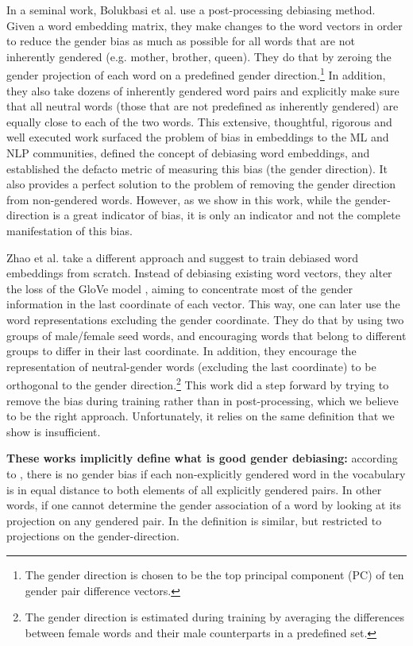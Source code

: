 \documentclass[11pt,a4paper]{article}
\begin{document}
	In a seminal work, Bolukbasi et al. \citeyearpar{BCZ16} use a post-processing debiasing method. Given a word embedding matrix, they make changes to the word vectors in order to reduce the gender bias as much as possible for all words that are not inherently gendered (e.g. mother, brother, queen). They do that by zeroing the gender projection of each word on a predefined gender direction.\footnote{The gender direction is chosen to be the top principal component (PC) of ten gender pair difference vectors.} In addition, they also take dozens of inherently gendered word pairs and explicitly make sure that all neutral words (those that are not predefined as inherently gendered) are equally close to each of the two words. This extensive, thoughtful, rigorous and well executed work surfaced the problem of bias in embeddings to the ML and NLP communities, defined the concept of debiasing word embeddings, and established the defacto metric of measuring this bias (the gender direction). It also provides a perfect solution to the problem of removing the gender direction from non-gendered words. However, as we show in this work, while the gender-direction is a great indicator of bias, it is only an indicator and not the complete manifestation of this bias.
	
	Zhao et al. \citeyearpar{ZZL18} take a different approach and suggest to train debiased word embeddings from scratch. Instead of debiasing existing word vectors, they alter the loss of the GloVe model \cite{PSM14}, aiming to concentrate most of the gender information in the last coordinate of each vector. This way, one can later use the word representations excluding the gender coordinate. They do that by using two groups of male/female seed words, and encouraging words that belong to different groups to differ in their last coordinate. In addition, they encourage the representation of neutral-gender words (excluding the last coordinate) to be orthogonal to the gender direction.\footnote{The gender direction is estimated during training by averaging the differences between female words and their male counterparts in a predefined set.}
	This work did a step forward by trying to remove the bias during training rather than in post-processing, which we believe to be the right approach. Unfortunately, it relies on the same definition that we show is insufficient.
	
	\noindent\textbf{These works implicitly define what is good gender debiasing:} according to \citet{BCZ16}, there is no
	gender bias if each non-explicitly gendered word in the vocabulary is in equal distance to both elements of all explicitly gendered pairs. In other words, if one cannot determine the gender association of a word by looking at its projection on any gendered pair. In \citet{ZZL18} the definition is similar, but restricted to projections on the gender-direction. 
	
\end{document}
